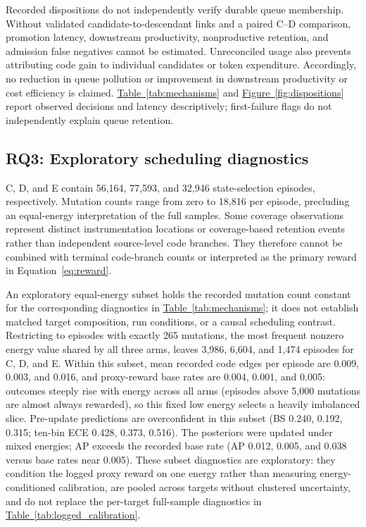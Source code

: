 \documentclass[final,5p,times,number]{elsarticle}
\newcommand{\namedref}[2]{\hyperref[#2]{#1~\ref*{#2}}}
\begin{document}
Recorded dispositions do not independently verify durable queue membership. Without validated candidate-to-descendant links and a paired C--D comparison, promotion latency, downstream productivity, nonproductive retention, and admission false negatives cannot be estimated. Unreconciled usage also prevents attributing code gain to individual candidates or token expenditure. Accordingly, no reduction in queue pollution or improvement in downstream productivity or cost efficiency is claimed. \namedref{Table}{tab:mechanisms} and \namedref{Figure}{fig:dispositions} report observed decisions and latency descriptively; first-failure flags do not independently explain queue retention.

\subsection{RQ3: Exploratory scheduling diagnostics}
C, D, and E contain 56,164, 77,593, and 32,946 state-selection episodes, respectively. Mutation counts range from zero to 18,816 per episode, precluding an equal-energy interpretation of the full samples. Some coverage observations represent distinct instrumentation locations or coverage-based retention events rather than independent source-level code branches. They therefore cannot be combined with terminal code-branch counts or interpreted as the primary reward in Equation~\ref{eq:reward}.

An exploratory equal-energy subset holds the recorded mutation count constant for the corresponding diagnostics in \namedref{Table}{tab:mechanisms}; it does not establish matched target composition, run conditions, or a causal scheduling contrast. Restricting to episodes with exactly 265 mutations, the most frequent nonzero energy value shared by all three arms, leaves 3,986, 6,604, and 1,474 episodes for C, D, and E. Within this subset, mean recorded code edges per episode are 0.009, 0.003, and 0.016, and proxy-reward base rates are 0.004, 0.001, and 0.005: outcomes steeply rise with energy across all arms (episodes above 5,000 mutations are almost always rewarded), so this fixed low energy selects a heavily imbalanced slice. Pre-update predictions are overconfident in this subset (BS 0.240, 0.192, 0.315; ten-bin ECE 0.428, 0.373, 0.516). The posteriors were updated under mixed energies; AP exceeds the recorded base rate (AP 0.012, 0.005, and 0.038 versus base rates near 0.005). These subset diagnostics are exploratory: they condition the logged proxy reward on one energy rather than measuring energy-conditioned calibration, are pooled across targets without clustered uncertainty, and do not replace the per-target full-sample diagnostics in \namedref{Table}{tab:logged_calibration}.
\end{document}
